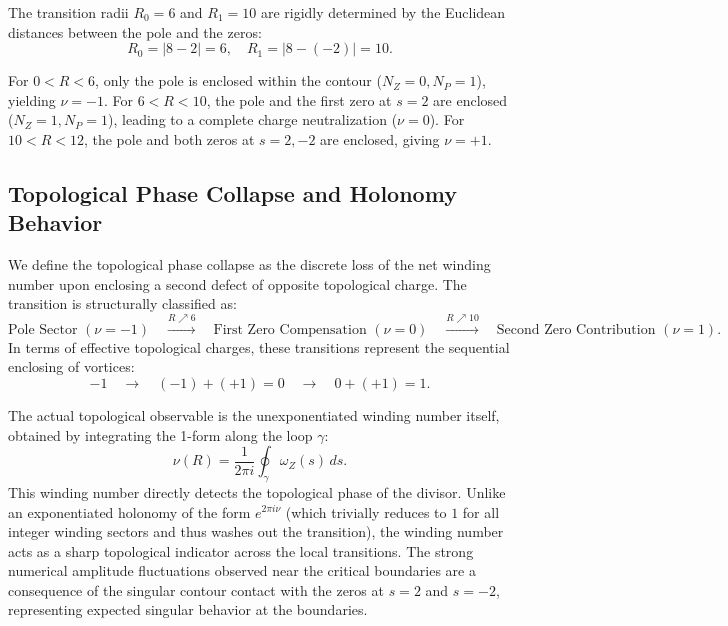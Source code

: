 \documentclass[11pt,a4paper]{article}
\theoremstyle{definition}
\begin{document}
	The transition radii $R_0 = 6$ and $R_1 = 10$ are rigidly determined by the Euclidean distances between the pole and the zeros:
	\begin{equation}
		R_0 = |8 - 2| = 6, \quad R_1 = |8 - (-2)| = 10.
	\end{equation}
	
	For $0 < R < 6$, only the pole is enclosed within the contour ($N_Z = 0, N_P = 1$), yielding $\nu = -1$. For $6 < R < 10$, the pole and the first zero at $s=2$ are enclosed ($N_Z = 1, N_P = 1$), leading to a complete charge neutralization ($\nu = 0$). For $10 < R < 12$, the pole and both zeros at $s=2, -2$ are enclosed, giving $\nu = +1$.
	
	\subsection{Topological Phase Collapse and Holonomy Behavior}
	We define the topological phase collapse as the discrete loss of the net winding number upon enclosing a second defect of opposite topological charge. The transition is structurally classified as:
	\begin{equation}
		\text{Pole Sector } (\nu = -1) \quad \xrightarrow{R \nearrow 6} \quad \text{First Zero Compensation } (\nu = 0) \quad \xrightarrow{R \nearrow 10} \quad \text{Second Zero Contribution } (\nu = 1).
	\end{equation}
	In terms of effective topological charges, these transitions represent the sequential enclosing of vortices:
	\begin{equation}
		-1 \quad \longrightarrow \quad (-1) + (+1) = 0 \quad \longrightarrow \quad 0 + (+1) = 1.
	\end{equation}
	
	The actual topological observable is the unexponentiated winding number itself, obtained by integrating the 1-form along the loop $\gamma$:
	\begin{equation}
		\nu(R) = \frac{1}{2\pi i} \oint_{\gamma} \omega_Z(s) \, ds.
	\end{equation}
	This winding number directly detects the topological phase of the divisor. Unlike an exponentiated holonomy of the form $e^{2\pi i \nu}$ (which trivially reduces to $1$ for all integer winding sectors and thus washes out the transition), the winding number acts as a sharp topological indicator across the local transitions. The strong numerical amplitude fluctuations observed near the critical boundaries are a consequence of the singular contour contact with the zeros at $s = 2$ and $s = -2$, representing expected singular behavior at the boundaries.
	
\end{document}
